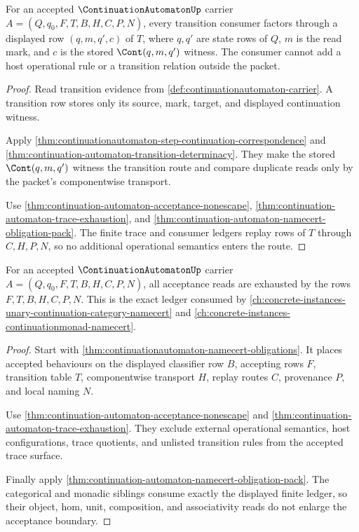 \begin{theorem}\label{thm:continuation-automaton-transition-route-closure}
For an accepted $\ContinuationAutomatonUp$ carrier $A=(Q,q_0,F,T,B,H,C,P,N)$,
every transition consumer factors through a displayed row $(q,m,q',c)$ of
$T$, where $q,q'$ are state rows of $Q$, $m$ is the read mark, and $c$ is the
stored $\Cont(q,m,q')$ witness. The consumer cannot add a host operational rule
or a transition relation outside the packet.
\end{theorem}
\begin{proof}
Read transition evidence from \autoref{def:continuationautomaton-carrier}. A
transition row stores only its source, mark, target, and displayed continuation
witness.

Apply \autoref{thm:continuationautomaton-step-continuation-correspondence} and
\autoref{thm:continuation-automaton-transition-determinacy}. They make the
stored $\Cont(q,m,q')$ witness the transition route and compare duplicate
reads only by the packet's componentwise transport.

Use \autoref{thm:continuation-automaton-acceptance-nonescape},
\autoref{thm:continuation-automaton-trace-exhaustion}, and
\autoref{thm:continuation-automaton-namecert-obligation-pack}. The finite
trace and consumer ledgers replay rows of $T$ through $C,H,P,N$, so no
additional operational semantics enters the route.
\end{proof}

\begin{theorem}\label{thm:continuation-automaton-acceptance-ledger-exactness}
For an accepted $\ContinuationAutomatonUp$ carrier $A=(Q,q_0,F,T,B,H,C,P,N)$,
all acceptance reads are exhausted by the rows $F,T,B,H,C,P,N$. This is the
exact ledger consumed by \autoref{ch:concrete-instances-unary-continuation-category-namecert}
and \autoref{ch:concrete-instances-continuationmonad-namecert}.
\end{theorem}
\begin{proof}
Start with \autoref{thm:continuationautomaton-namecert-obligations}. It places
accepted behaviours on the displayed classifier row $B$, accepting rows $F$,
transition table $T$, componentwise transport $H$, replay routes $C$,
provenance $P$, and local naming $N$.

Use \autoref{thm:continuation-automaton-acceptance-nonescape} and
\autoref{thm:continuation-automaton-trace-exhaustion}. They exclude external
operational semantics, host configurations, trace quotients, and unlisted
transition rules from the accepted trace surface.

Finally apply \autoref{thm:continuation-automaton-namecert-obligation-pack}.
The categorical and monadic siblings consume exactly the displayed finite
ledger, so their object, hom, unit, composition, and associativity reads do
not enlarge the acceptance boundary.
\end{proof}

